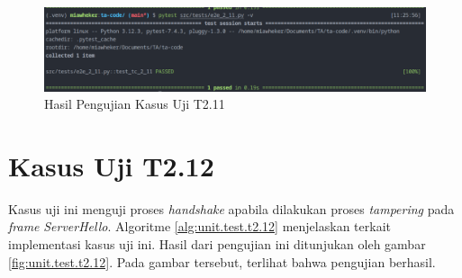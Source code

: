 \begin{figure}[ht]
  \centering
  \includegraphics[width=\textwidth]{chapters/res/appendix-4/2.11.png}
  \caption{Hasil Pengujian Kasus Uji T2.11}
  \label{fig:unit.test.t2.11}
\end{figure}

\section{Kasus Uji T2.12}

Kasus uji ini menguji proses \emph{handshake} apabila dilakukan proses \emph{tampering} pada \emph{frame} \emph{ServerHello}. Algoritme \ref{alg:unit.test.t2.12} menjelaskan terkait implementasi kasus uji ini. Hasil dari pengujian ini ditunjukan oleh gambar \ref{fig:unit.test.t2.12}. Pada gambar tersebut, terlihat bahwa pengujian berhasil.


